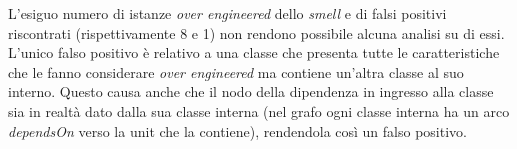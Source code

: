         L'esiguo numero di istanze \textit{over engineered} dello \textit{smell} e di falsi positivi riscontrati (rispettivamente 8 e 1) non rendono possibile alcuna analisi su di essi. L'unico falso positivo è relativo a una classe che presenta tutte le caratteristiche che le fanno considerare \textit{over engineered} ma contiene un'altra classe al suo interno. Questo causa anche che il nodo della dipendenza in ingresso alla classe sia in realtà dato dalla sua classe interna (nel grafo ogni classe interna ha un arco \textit{dependsOn} verso la unit che la contiene), rendendola così un falso positivo. 
            
